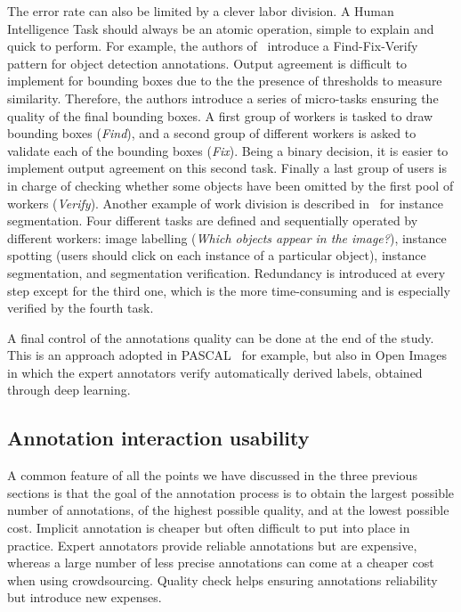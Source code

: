The error rate can also be limited by a clever labor division.
A Human Intelligence Task should always be an atomic operation,
simple to explain and quick to perform.
For example, the authors of~\cite{su2012crowdsourcing} introduce
a Find-Fix-Verify pattern for object detection annotations.
Output agreement is difficult to implement for bounding boxes
due to the the presence of thresholds to measure similarity.
Therefore, the authors introduce a series of micro-tasks
ensuring the quality of the final bounding boxes.
A first group of workers is tasked to draw bounding boxes (\textit{Find}),
and a second group of different workers is asked to validate
each of the bounding boxes (\textit{Fix}).
Being a binary decision,
it is easier to implement output agreement on this second task.
Finally a last group of users is in charge of checking whether
some objects have been omitted by the first pool of workers (\textit{Verify}).
Another example of work division is described
in~\cite{chen2015microsoft} for instance segmentation.
Four different tasks are defined and sequentially operated by different workers:
image labelling (\textit{Which objects appear in the image?}),
instance spotting (users should click on each instance of a particular object),
instance segmentation, and segmentation verification.
Redundancy is introduced at every step except for the third one,
which is the more time-consuming and is especially verified by the fourth task.


A final control of the annotations quality can be done at the end of the study.
This is an approach adopted in PASCAL~\cite{Everingham10} for example,
but also in Open Images~\cite{OpenImages} in which the expert annotators
verify automatically derived labels, obtained through deep learning.


\subsection{Annotation interaction usability}

A common feature of all the points we have discussed
in the three previous sections is that the goal of the annotation process
is to obtain the largest possible number of annotations,
of the highest possible quality, and at the lowest possible cost.
Implicit annotation is cheaper but often difficult to put into place in practice.
Expert annotators provide reliable annotations but are expensive,
whereas a large number of less precise annotations can come
at a cheaper cost when using crowdsourcing.
Quality check helps ensuring annotations reliability but introduce new expenses.


